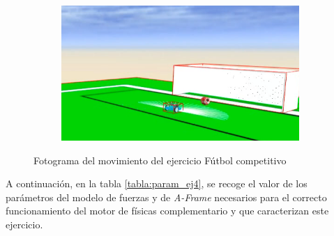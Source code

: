 \begin{figure}[h!]
\begin{subfigure}[b]{0.2\textwidth}
  \end{subfigure}
    \hfill
  \begin{subfigure}[b]{0.2\textwidth}
    \includegraphics[width=\textwidth, height=\textwidth]{futbol4.png}
  \end{subfigure}
\caption{Fotograma del movimiento del ejercicio Fútbol competitivo}
\label{fig:movimiento_balón}
\end{figure}

A continuación, en la tabla \ref{tabla:param_ej4}, se recoge el valor de los parámetros del modelo de fuerzas y de  \textit{A-Frame} necesarios para el correcto funcionamiento del motor de físicas complementario y que caracterizan este ejercicio.

